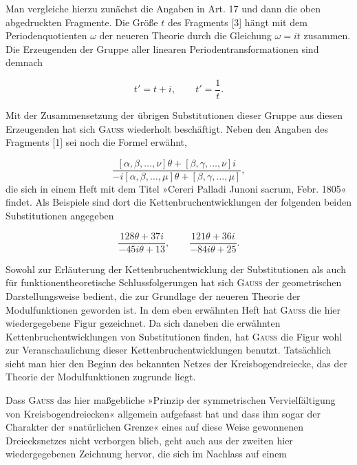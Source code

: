 Man vergleiche hierzu zunächst die Angaben in Art. 17 und dann die oben abgedruckten Fragmente. Die Größe $t$ des Fragments [3] hängt mit dem Periodenquotienten $\omega$ der neueren Theorie durch die Gleichung $\omega = it$ zusammen. Die Erzeugenden der Gruppe aller linearen Periodentransformationen sind demnach

\[
t' = t+i, \qquad t' = \frac1t.
\]

Mit der Zusammensetzung der übrigen Substitutionen dieser Gruppe aus diesen Erzeugenden hat sich \textsc{Gauss} wiederholt beschäftigt. Neben den Angaben des Fragments [1] sei noch die Formel erwähnt,

\[
\frac{[\alpha,\beta,\ldots,\nu]\theta+[\beta,\gamma,\ldots,\nu]i}{-i[\alpha,\beta,\ldots,\mu]\theta+[\beta,\gamma,\ldots,\mu]},
\]
die sich in einem Heft mit dem Titel »Cereri Palladi Junoni sacrum, Febr. 1805« findet. Als Beispiele sind dort die Kettenbruchentwicklungen der folgenden beiden Substitutionen angegeben

\[
\frac{128\theta+37i}{-45i\theta+13}, \qquad \frac{121\theta+36i}{-84i\theta+25}.
\]

Sowohl zur Erläuterung der Kettenbruchentwicklung der Substitutionen als auch für funktionentheoretische Schlussfolgerungen hat sich \textsc{Gauss} der geometrischen Darstellungsweise bedient, die zur Grundlage der neueren Theorie der Modulfunktionen geworden ist. In dem eben erwähnten Heft hat \textsc{Gauss} die hier wiedergegebene Figur gezeichnet. Da sich daneben die erwähnten Kettenbruchentwicklungen von Substitutionen finden, hat \textsc{Gauss} die Figur wohl zur Veranschaulichung dieser Kettenbruchentwicklungen benutzt. Tatsächlich sieht man hier den Beginn des bekannten Netzes der Kreisbogendreiecke, das der Theorie der Modulfunktionen zugrunde liegt.

\begin{center}\resizebox{9.7cm}{!}{}\end{center}

Dass \textsc{Gauss} das hier maßgebliche »Prinzip der symmetrischen Vervielfältigung von Kreisbogendreiecken« allgemein aufgefasst hat und dass ihm sogar der Charakter der »natürlichen Grenze« eines auf diese Weise gewonnenen Dreiecksnetzes nicht verborgen blieb, geht auch aus der zweiten hier wiedergegebenen Zeichnung hervor, die sich im Nachlass auf einem

\begin{center}\resizebox{12.3cm}{!}{}\end{center}

